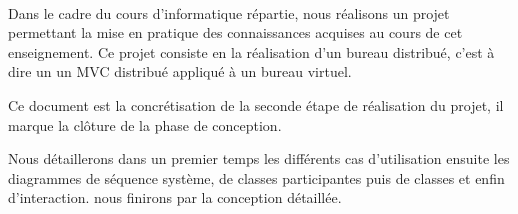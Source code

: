 \paragraph{}Dans le cadre du cours d'informatique répartie, nous réalisons un projet permettant la mise en pratique des connaissances acquises au cours de cet enseignement. Ce projet consiste en la réalisation d'un bureau distribué, c'est à dire un un MVC distribué appliqué à un bureau virtuel. 

Ce document est la concrétisation de la seconde étape de réalisation du projet, il marque la clôture de la phase de conception.

Nous détaillerons dans un premier temps les différents cas d'utilisation ensuite les diagrammes de séquence système, de classes participantes puis de classes et enfin d'interaction. nous finirons par la conception détaillée.   
